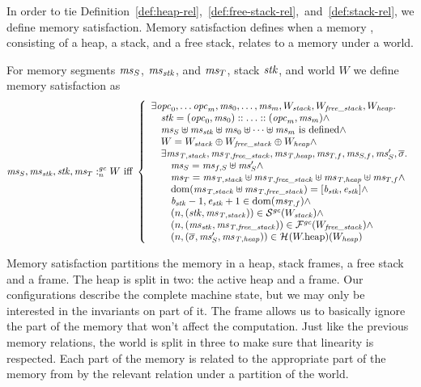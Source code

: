 \begin{jversion}
In order to tie Definition~\ref{def:heap-rel},~\ref{def:free-stack-rel},~and~\ref{def:stack-rel}, we define memory satisfaction.
Memory satisfaction defines when a \srccm{} memory , consisting of a heap, a stack, and a free stack, relates to a \trgcm{} memory under a world.
\begin{definition}
  For memory segments $\mathit{ms}_S$, $\mathit{ms}_{\mathit{stk}}$, and $\mathit{ms}_T$, stack $\mathit{stk}$, and world $W$ we define memory satisfaction as
\[
  \mathit{ms}_S,\mathit{ms}_{\mathit{stk}},\mathit{stk},\mathit{ms}_T :_{n}^{\mathit{gc}}W \text{ iff } 
  \left\{
    \begin{array}{l}
      \exists \mathit{opc}_0, \dots \mathit{opc}_m, \mathit{ms}_0, \dots, \mathit{ms}_m, W_{\mathit{stack}}, W_{\mathit{free\_stack}}, W_{\mathit{heap}} \ldotp\\
      \quad \mathit{stk} = (\mathit{opc}_0,\mathit{ms}_0):: \dots :: (\mathit{opc}_m,\mathit{ms}_m) \wedge \\
      \quad \mathit{ms}_S \uplus \mathit{ms}_{\mathit{stk}} \uplus \mathit{ms}_0 \uplus \dots \uplus \mathit{ms}_m  \text{ is defined} \wedge\\
      \quad W = W_{\mathit{stack}} \oplus W_{\mathit{free\_stack}} \oplus W_{\mathit{heap}} \wedge\\
      \quad\exists \mathit{ms}_{\mathit{T,stack}}, \mathit{ms}_{\mathit{T,free\_stack}}, \mathit{ms}_{\mathit{T,heap}}, \mathit{ms}_{T,f}, \mathit{ms}_{S,f}, \mathit{ms}_S',\overline{\sigma}\ldotp \\
      \qquad \mathit{ms}_S = \mathit{ms}_{f,S} \uplus \mathit{ms}_S' \wedge \\
      \qquad \mathit{ms}_T = \mathit{ms}_{\mathit{T,stack}} \uplus \mathit{ms}_{\mathit{T,free\_stack}} \uplus \mathit{ms}_{\mathit{T,heap}} \uplus \mathit{ms}_{T,f} \wedge \\
      \qquad \mathrm{dom}(\mathit{ms}_{\mathit{T,stack}} \uplus \mathit{ms}_{\mathit{T,free\_stack}}) = [\mathit{b}_{\mathit{stk}},\mathit{e}_{\mathit{stk}}] \wedge \\
      \qquad \mathit{b}_{\mathit{stk}} -1,\mathit{e}_{\mathit{stk}} + 1 \in \mathrm{dom}(\mathit{ms}_{T,f}) \wedge \\
      \qquad \left(n,(\mathit{stk},\mathit{ms}_{\mathit{T,stack}})\right) \in \mathcal{S}^{\mathit{gc}}(W_{\mathit{stack}}) \wedge \\
      \qquad \left(n,(\mathit{ms}_{\mathit{stk}},\mathit{ms}_{\mathit{T,free\_stack}})\right) \in \mathcal{F}^{\mathit{gc}}(W_{\mathit{free\_stack}}) \wedge \\
      \qquad \left(n,(\overline{\sigma},\mathit{ms}_S',\mathit{ms}_{\mathit{T,heap}})\right) \in \mathcal{H}^{}(W.\mathrm{heap})(W_{\mathit{heap}})
    \end{array}
  \right.
\]
\end{definition}
Memory satisfaction partitions the \trgcm{} memory in a heap, stack frames, a free stack and a frame.
The \srccm{} heap is split in two: the active heap and a frame.
Our configurations describe the complete machine state, but we may only be interested in the invariants on part of it.
The frame allows us to basically ignore the part of the memory that won't affect the computation.
Just like the previous memory relations, the world is split in three to make sure that linearity is respected.
Each part of the \srccm{} memory is related to the appropriate part of the memory from \trgcm{} by the relevant relation under a partition of the world.


\end{jversion}
